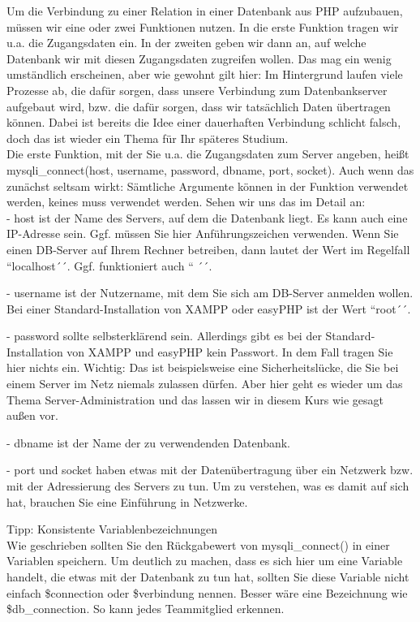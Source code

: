 Um die Verbindung zu einer Relation in einer Datenbank aus PHP aufzubauen, müssen wir eine oder zwei Funktionen nutzen. In die erste Funktion tragen wir u.a. die Zugangsdaten ein. In der zweiten geben wir dann an, auf welche Datenbank wir mit diesen Zugangsdaten zugreifen wollen. Das mag ein wenig umständlich erscheinen, aber wie gewohnt gilt hier: Im Hintergrund laufen viele Prozesse ab, die dafür sorgen, dass unsere Verbindung zum Datenbankserver aufgebaut wird, bzw. die dafür sorgen, dass wir tatsächlich Daten übertragen können. Dabei ist bereits die Idee einer dauerhaften Verbindung schlicht falsch, doch das ist wieder ein Thema für Ihr späteres Studium.\\

Die erste Funktion, mit der Sie u.a. die Zugangsdaten zum Server angeben, heißt mysqli\_connect(host, username, password, dbname, port, socket). Auch wenn das zunächst seltsam wirkt: Sämtliche Argumente können in der Funktion verwendet werden, keines muss verwendet werden. Sehen wir uns das im Detail an:\\

-	host ist der Name des Servers, auf dem die Datenbank liegt. Es kann auch eine IP-Adresse sein. Ggf. müssen Sie hier Anführungszeichen verwenden. Wenn Sie einen DB-Server auf Ihrem Rechner betreiben, dann lautet der Wert im Regelfall ``localhost´´. Ggf. funktioniert auch `` ´´.

-	username ist der Nutzername, mit dem Sie sich am DB-Server anmelden wollen. Bei einer Standard-Installation von XAMPP oder easyPHP ist der Wert ``root´´.

-	password sollte selbsterklärend sein. Allerdings gibt es bei der Standard-Installation von XAMPP und easyPHP kein Passwort. In dem Fall tragen Sie hier nichts ein. Wichtig: Das ist beispielsweise eine Sicherheitslücke, die Sie bei einem Server im Netz niemals zulassen dürfen. Aber hier geht es wieder um das Thema Server-Administration und das lassen wir in diesem Kurs wie gesagt außen vor.

-	dbname ist der Name der zu verwendenden Datenbank.

-	port und socket haben etwas mit der Datenübertragung über ein Netzwerk bzw. mit der Adressierung des Servers zu tun. Um zu verstehen, was es damit auf sich hat, brauchen Sie eine Einführung in Netzwerke.

Tipp: Konsistente Variablenbezeichnungen\\

Wie geschrieben sollten Sie den Rückgabewert von mysqli\_connect() in einer Variablen speichern. Um deutlich zu machen, dass es sich hier um eine Variable handelt, die etwas mit der Datenbank zu tun hat, sollten Sie diese Variable nicht einfach \$connection oder \$verbindung nennen. Besser wäre eine Bezeichnung wie \$db\_connection. So kann jedes Teammitglied erkennen.\\

